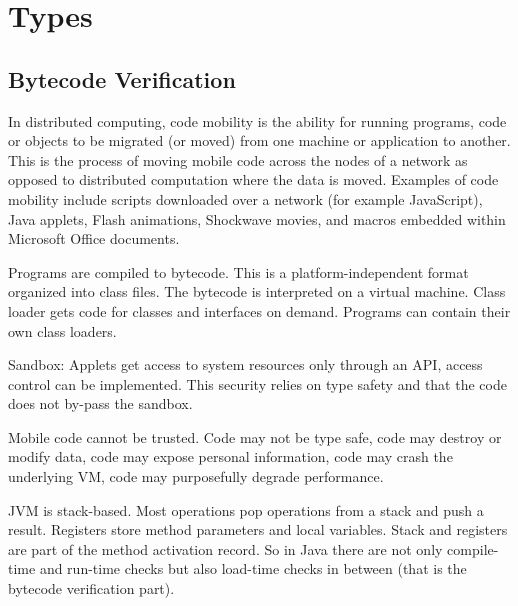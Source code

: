 \section{Types}
\subsection{Bytecode Verification}
\begin{mytitle} In distributed computing, code mobility is the ability for running programs, code or objects to be migrated (or moved) from one machine or application to another. This is the process of moving mobile code across the nodes of a network as opposed to distributed computation where the data is moved. Examples of code mobility include scripts downloaded over a network (for example JavaScript), Java applets, Flash animations, Shockwave movies, and macros embedded within Microsoft Office documents. 
\end{mytitle}
\begin{mytitle} Programs are compiled to bytecode. This is a platform-independent format organized into class files. The bytecode is interpreted on a virtual machine. Class loader gets code for classes and interfaces on demand. Programs can contain their own class loaders.
\end{mytitle}
\begin{mytitle} Sandbox: Applets get access to system resources only through an API, access control can be implemented. This security relies on type safety and that the code does not by-pass the sandbox.
\end{mytitle}
\begin{mytitle} Mobile code cannot be trusted. Code may not be type safe, code may destroy or modify data, code may expose personal information, code may crash the underlying VM, code may purposefully degrade performance.
\end{mytitle}
\begin{mytitle} JVM is stack-based. Most operations pop operations from a stack and push a result. Registers store method parameters and local variables. Stack and registers are part of the method activation record. So in Java there are not only compile-time and run-time checks but also load-time checks in between (that is the bytecode verification part).
\end{mytitle}
